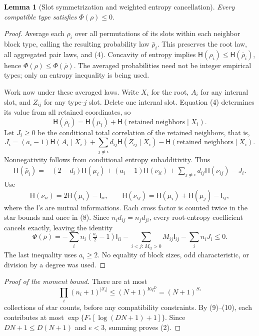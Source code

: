 \documentclass[11pt]{article}
\newtheorem{lemma}{Lemma}
\newcommand{\HH}{\mathsf H}
\newcommand{\II}{\mathsf I}
\begin{document}
\begin{lemma}[Slot symmetrization and weighted entropy cancellation]
Every compatible type satisfies $\Phi(\rho)\leq0$.
\end{lemma}
\begin{proof}
Average each $\rho_i$ over all permutations of its slots within each
neighbor block type, calling the resulting probability law $\bar\rho_i$.
This preserves the root law, all aggregated pair laws, and (4). Concavity
of entropy implies $\HH(\rho_i)\leq\HH(\bar\rho_i)$, hence
$\Phi(\rho)\leq\Phi(\bar\rho)$. The averaged probabilities need not be
integer empirical types; only an entropy inequality is being used.

Work now under these averaged laws. Write $X_i$ for the root, $A_i$ for
any internal slot, and $Z_{ij}$ for any type-$j$ slot. Delete one internal
slot. Equation (4) determines its value from all retained coordinates, so
\[
 \HH(\bar\rho_i)=\HH(\mu_i)+
    \HH(\text{retained neighbors}\mid X_i).
\]
Let $J_i\geq0$ be the conditional total correlation of the retained
neighbors, that is,
\[
 J_i=(a_i-1)\HH(A_i\mid X_i)
       +\sum_{j\ne i}d_{ij}\HH(Z_{ij}\mid X_i)
       -\HH(\text{retained neighbors}\mid X_i).
\]
Nonnegativity follows from conditional entropy subadditivity. Thus
\begin{align*}
 \HH(\bar\rho_i)
 ={}&(2-d_i)\HH(\mu_i)+(a_i-1)\HH(\nu_{ii})
       +\sum_{j\ne i}d_{ij}\HH(\nu_{ij})-J_i.
\end{align*}
Use
\[
 \HH(\nu_{ii})=2\HH(\mu_i)-\II_{ii},\qquad
 \HH(\nu_{ij})=\HH(\mu_i)+\HH(\mu_j)-\II_{ij},
\]
where the $\II$'s are mutual informations. Each cross factor is counted
twice in the star bounds and once in (8). Since $n_i d_{ij}=n_jd_{ji}$,
every root-entropy coefficient cancels exactly, leaving the identity
\[
 \Phi(\bar\rho)=
 -\sum_i n_i(\tfrac{a_i}{2}-1)\II_{ii}
 -\sum_{i<j:\,M_{ij}>0}M_{ij}\II_{ij}
 -\sum_i n_iJ_i\leq0.                               \tag{10}
\]
The last inequality uses $a_i\geq2$. No equality of block sizes, odd
characteristic, or division by a degree was used.
\end{proof}

\begin{proof}[Proof of the moment bound]
There are at most
\[
 \prod_i(n_i+1)^{|\mathcal S_i|}
 \leq(N+1)^{Kq_*^D}=(N+1)^{S_*}
\]
collections of star counts, before any compatibility constraints.
By (9)--(10), each contributes at most
$\exp\{F_*[\log(DN+1)+1]\}$. Since $DN+1\leq D(N+1)$ and $e<3$,
summing proves (2).
\end{proof}
\end{document}
